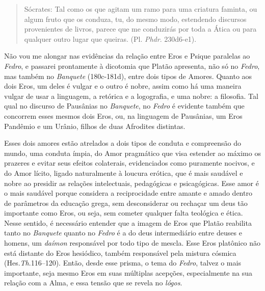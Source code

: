  

\begin{quote}
Sócrates: \redondo{[…]} Tal como os que agitam um ramo para uma
criatura faminta, ou algum fruto que os conduza, tu, do mesmo modo,
estendendo discursos provenientes de livros, parece que me conduzirás
por toda a Ática ou para qualquer outro lugar que queiras.
(Pl. \emph{Phdr}. 230d6-e1).
\end{quote}

 

Não vou me alongar nas evidências da relação entre Eros e Psique
paralelas ao \emph{Fedro}, e passarei prontamente à dicotomia que Platão
apresenta, não só no \emph{Fedro}, mas também
no \emph{Banquete }(180c-181d), entre dois tipos de Amores. Quanto aos
dois Eros, um deles é vulgar e o outro é nobre, assim como há uma maneira
vulgar de usar a linguagem, a retórica e a logografia, e uma nobre: a
filosofia. Tal qual no discurso de Pausânias no \emph{Banquete},
no \emph{Fedro} é evidente também que concorrem esses mesmos dois Eros,
ou, na linguagem de Pausânias, um Eros Pandêmio e um Urânio, filhos de
duas Afrodites distintas.

Esses dois amores estão atrelados a dois tipos de conduta e compreensão
do mundo, uma conduta ímpia, do Amor pragmático que visa estender ao
máximo os prazeres e evitar seus efeitos colaterais, evidenciados como
puramente nocivos, e do Amor lícito, ligado naturalmente à loucura
erótica, que é mais saudável e nobre ao presidir as relações
intelectuais, pedagógicas e psicagógicas. Esse amor é o mais saudável
porque considera a reciprocidade entre amante e amado dentro de
parâmetros da educação grega, sem desconsiderar ou rechaçar um deus tão
importante como Eros, ou seja, sem cometer qualquer falta teológica e
ética. Nesse sentido, é necessário entender que a imagem de Eros que
Platão reabilita tanto no \emph{Banquete} quanto no \emph{Fedro} é a do
deus intermediário entre deuses e homens, um \emph{daímon} responsável
por todo tipo de mescla. Esse Eros platônico não está distante do Eros
hesiódico, também responsável pela mistura cósmica
(Hes.\emph{Th}.116--120). Então, desde esse prisma, o tema
do \emph{Fedro}, talvez o mais importante, seja mesmo Eros em suas
múltiplas acepções, especialmente na sua relação com a Alma, e essa
tensão que se revela no \emph{lógos}.

